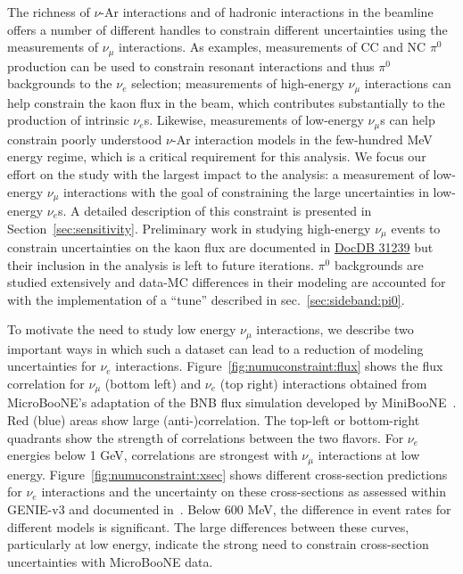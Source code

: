 \par The richness of $\nu$-Ar interactions and of hadronic interactions in the beamline offers a number of different handles 
to constrain different uncertainties using the measurements of $\nu_{\mu}$ interactions.
As examples, measurements of CC and NC $\pi^0$ production can be used to constrain resonant interactions and thus $\pi^0$ backgrounds to the $\nu_e$ selection; measurements of high-energy $\nu_{\mu}$ interactions can help constrain the kaon flux in the beam, which contributes substantially to the production of intrinsic $\nu_e$s. Likewise, measurements of low-energy $\nu_{\mu}$s can help constrain poorly understood $\nu$-Ar interaction models in the few-hundred MeV energy regime, which is a critical requirement for this analysis. We focus our effort on the study with the largest impact to the analysis: a measurement of low-energy $\nu_{\mu}$ interactions with the goal of constraining the large uncertainties in low-energy $\nu_e$s. A detailed  description of this constraint is presented in Section~\ref{sec:sensitivity}. Preliminary work in studying high-energy $\nu_{\mu}$ events to constrain uncertainties on the kaon flux are documented in \href{https://microboone-docdb.fnal.gov/cgi-bin/private/ShowDocument?docid=31239}{DocDB 31239} but their inclusion in the analysis is left to future iterations. $\pi^0$ backgrounds are studied extensively and data-MC differences in their modeling are accounted for with the implementation of a ``tune'' described in sec.~\ref{sec:sideband:pi0}.
\par To motivate the need to study low energy $\nu_{\mu}$ interactions, we describe two important ways in which such a dataset can lead to a reduction of modeling uncertainties for $\nu_e$ interactions. Figure~\ref{fig:numuconstraint:flux} shows the flux correlation for $\nu_{\mu}$ (bottom left) and $\nu_e$ (top right) interactions obtained from MicroBooNE's adaptation of the BNB flux simulation developed by MiniBooNE~\cite{bib:fluxmcc9,bib:fluxtechnote}. Red (blue) areas show large (anti-)correlation. The top-left or bottom-right quadrants show the strength of correlations between the two flavors. For $\nu_e$ energies below 1 GeV, correlations are strongest with $\nu_{\mu}$ interactions at low energy. Figure~\ref{fig:numuconstraint:xsec} shows different cross-section predictions for $\nu_{e}$ interactions and the uncertainty on these cross-sections as assessed within GENIE-v3 and documented in~\cite{bib:1074}. Below 600 MeV, the difference in event rates for different models is significant. The large differences between these curves, particularly at low energy, indicate the strong need to constrain cross-section uncertainties with MicroBooNE data. 
